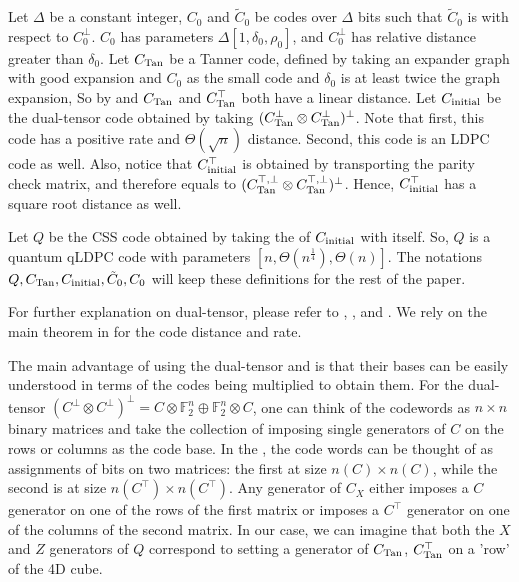 \begin{definition}
  \label{def:thecode}
  Let $\Delta$ be a constant integer, $C_{0}$ and $\tilde{C}_{0}$ be codes over $\Delta$ bits such that $\tilde{C}_{0}$ is \trig with respect to $C^{\perp}_{0}$. $C_{0}$ has parameters $\Delta[1,\delta_{0},\rho_{0}]$, and $C_{0}^\perp$ has relative distance greater than $\delta_{0}$. Let $C_{\text{Tan}}$ be a Tanner code, defined by taking an expander graph with good expansion and $C_{0}$ as the small code and $\delta_{0}$ is at least twice the graph expansion, So by \cite{ExpanderCodes} and  $C_{\text{Tan}}$ and $C_{\text{Tan}}^\top$ both have a linear distance. Let $C_{\text{initial}}$ be the dual-tensor code obtained by taking $(C_{\text{Tan}}^\perp \otimes C_{\text{Tan}}^\perp )^\perp$. Note that first, this code has a positive rate and $\Theta(\sqrt{n})$ distance. Second, this code is an LDPC code as well. Also, notice that $C_{\text{initial}}^{\top}$ is obtained by transporting the parity check matrix, and therefore equals to $(C_{\text{Tan}}^{\top, \perp} \otimes C_{\text{Tan}}^{\top, \perp} )^\perp$. Hence, $C_{\text{initial}}^{\top}$ has a square root distance as well.

Let $Q$ be the CSS code obtained by taking the \Hyp of $C_{\text{initial}}$ with itself. So, $Q$ is a quantum qLDPC code with parameters $[n, \Theta(n^{\frac{1}{4}}), \Theta(n)]$. The notations $Q,C_{\text{Tan}}, C_{\text{initial}}, \tilde{C}_{0}, C_{0}$ will keep these definitions for the rest of the paper.
\end{definition}
For further explanation on dual-tensor, please refer to \cite{leverrier2022quantum}, \cite{Dinur}, and \cite{Pavel}. We rely on the main theorem in \cite{Tillich_2014} for the \Hyp code distance and rate.

The main advantage of using the dual-tensor and \Hyp is that their bases can be easily understood in terms of the codes being multiplied to obtain them. For the dual-tensor $(C^{\perp}\otimes C^{\perp})^{\perp} = C\otimes \mathbb{F}_{2}^{n} \oplus \mathbb{F}_{2}^{n} \otimes C$, one can think of the codewords as $n\times n$ binary matrices and take the collection of imposing single generators of $C$ on the rows or columns as the code base. In the \Hyp, the code words can be thought of as assignments of bits on two matrices: the first at size $n(C) \times n(C)$, while the second is at size $n(C^\top) \times n(C^\top)$. Any generator of $C_{X}$ either imposes a $C$ generator on one of the rows of the first matrix or imposes a $C^{\top}$ generator on one of the columns of the second matrix. In our case, we can imagine that both the $X$ and $Z$ generators of $Q$ correspond to setting a generator of $C_{\text{Tan}}$, $C_{\text{Tan}}^\top$ on a 'row' of the 4D cube.


